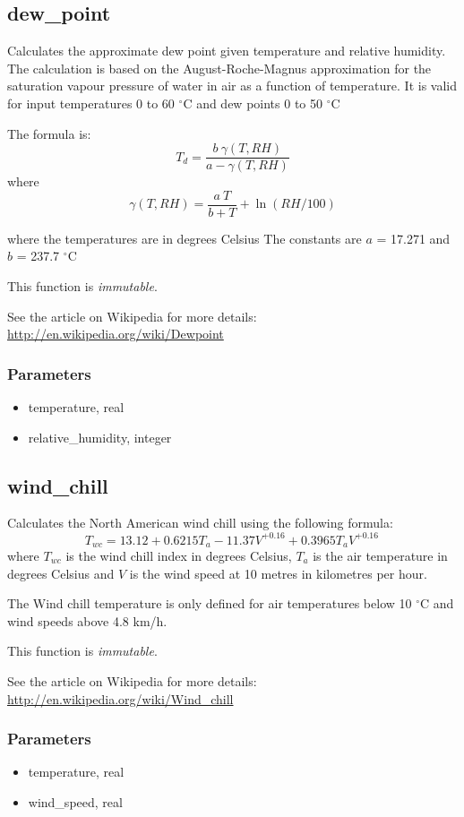 \documentclass[a4paper,10pt]{book}
\begin{document}
\subsection{dew\_point}
\label{dew_point}

Calculates the approximate dew point given temperature and relative humidity. The calculation is based on the August-Roche-Magnus approximation for the saturation vapour pressure of water in air as a function of temperature. It is valid for input temperatures 0 to 60 $^{\circ}$C and dew points 0 to 50 $^{\circ}$C

The formula is:
$$T_d = \frac {b\ \gamma(T,RH)} {a - \gamma(T,RH)}$$
where
$$\gamma(T,RH) = \frac {a\ T} {b+T} + \ln (RH/100)$$

where the temperatures are in degrees Celsius The constants are $a$ = 17.271 and $b$ = 237.7 $^{\circ}$C

This function is \emph{immutable}.

See the article on Wikipedia for more details: \url{http://en.wikipedia.org/wiki/Dewpoint}

\subsubsection{Parameters}
\begin{itemize}
\item temperature, real
\item relative\_humidity, integer
\end{itemize}

\subsection{wind\_chill}
\label{wind_chill}
Calculates the North American wind chill using the following formula:
$$T_{wc}=13.12 + 0.6215 T_a-11.37 V^{+0.16} + 0.3965 T_a V^{+0.16}\,\!$$
where $T_{wc}$ is the wind chill index in degrees Celsius, $T_a$ is the air temperature in degrees Celsius and $V$ is the wind speed at 10 metres in kilometres per hour.

The Wind chill temperature is only defined for air temperatures below 10 $^{\circ}$C and wind speeds above 4.8 km/h.

This function is \emph{immutable}.

See the article on Wikipedia for more details:
\url{http://en.wikipedia.org/wiki/Wind_chill}

\subsubsection{Parameters}
\begin{itemize}
\item temperature, real
\item wind\_speed, real
\end{itemize}
\end{document}
